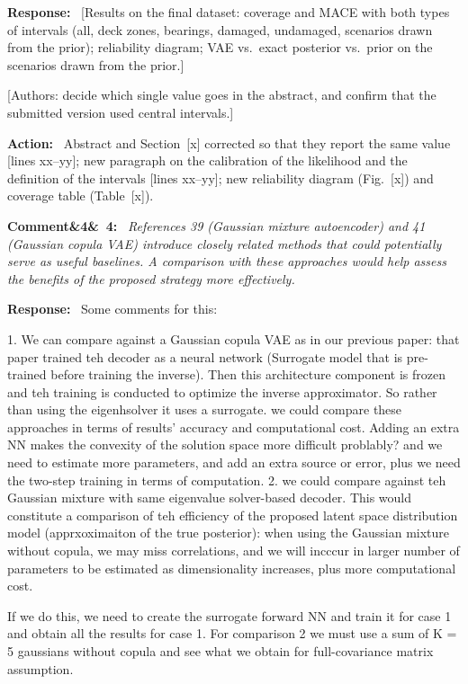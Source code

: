 \documentclass[11pt]{article}
\newenvironment{rcomment}[1]{\par\bigskip\noindent\textbf{Comment\ifx&#1&\else\ #1\fi:}\ \itshape}{\par}
\newenvironment{response}{\par\smallskip\noindent\color{resp}\textbf{Response:}\ }{\par}
\newenvironment{action}{\par\smallskip\noindent\color{resp}\textbf{Action:}\ }{\par}
\newcommand{\authornote}[1]{\textcolor{note}{\textsf{[Authors: #1]}}}
\newcommand{\tbd}[1]{\textcolor{note}{\textsf{[#1]}}}
\newcommand{\lines}[1]{\tbd{lines #1}}
\begin{document}
\begin{response}
\tbd{Results on the final dataset: coverage and MACE with both types of intervals (all, deck zones, bearings, damaged, undamaged,
scenarios drawn from the prior); reliability diagram; VAE vs.\ exact posterior vs.\ prior on the scenarios drawn from the prior.}
\end{response}
\authornote{decide which single value goes in the abstract, and confirm that the submitted version used central intervals.}

\begin{action}
Abstract and Section~\tbd{x} corrected so that they report the same value \lines{xx--yy}; new paragraph on the
calibration of the likelihood and the definition of the intervals \lines{xx--yy}; new reliability diagram (Fig.~\tbd{x})
and coverage table (Table~\tbd{x}).
\end{action}

\begin{rcomment}{4}
References 39 (Gaussian mixture autoencoder) and 41 (Gaussian copula VAE) introduce closely related methods that could
potentially serve as useful baselines. A comparison with these approaches would help assess the benefits of the proposed
strategy more effectively.
\end{rcomment}

\begin{response}
Some comments for this:

1. We can compare against a Gaussian copula VAE as in our previous paper: that paper trained teh decoder as a neural network (Surrogate model that is pre-trained before training the inverse). Then this architecture component is frozen and teh training is conducted to optimize the inverse approximator. So rather than using the eigenhsolver it uses a surrogate. we could compare these approaches in terms of results' accuracy and computational cost. Adding an extra NN makes the convexity of the solution space more difficult problably? and we need to estimate more parameters, and add an extra source or error, plus we need the two-step training in terms of computation.
2. we could compare against teh Gaussian mixture with same eigenvalue solver-based decoder. This would constitute a comparison of teh efficiency of the proposed latent space distribution model (apprxoximaiton of the true posterior): when using the Gaussian mixture without copula, we may miss correlations, and we will incccur in larger number of parameters to be estimated as dimensionality increases, plus more computational cost. 

If we do this, we need to create the surrogate forward NN  and train it for case 1 and obtain all the results for case 1.   
For comparison 2 we must use a sum of K = 5 gaussians without copula and see what we obtain for full-covariance matrix assumption. 



\end{response}
\end{document}
